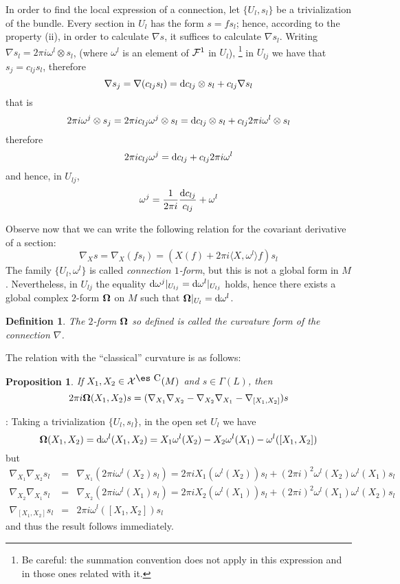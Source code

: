 \documentclass[12pt]{article}
\theoremstyle{plain}
\newtheorem{prop}{Proposition}
\newtheorem{definition}{Definition}
\def\beq{\begin{equation}}
\def\eeq{\end{equation}}
\def\beann{\begin{eqnarray*}}
\def\eeann{\end{eqnarray*}}
\def\qed{\ifvmode\removelastskip\fi
{\unskip\nobreak\hfil\penalty50\hbox{}\nobreak\hfil
\hbox{\vrule height1.2ex width1.2ex}\parfillskip=0pt
\finalhyphendemerits=0 \par\smallskip}}
\def\d{{\rm d}}
\def\curv{{\bf \Omega}}
\def\Complex{\mbox{\es C}}
\begin{document}
In order to find the local expression of a connection,
let $\{ U_l,s_l \}$ be a trivialization of the bundle.
Every section in $U_l$ has the form $s=fs_l$;
hence, according to the property (ii),
in order to calculate $\nabla s$,
it suffices to calculate $\nabla s_l$.
Writing
$\nabla s_l = 2\pi i \omega^l  \otimes s_l$,
(where $\omega^l $ is an element of
${\cal F}^1$ in $U_l$),%
\footnote{
Be careful: the summation convention does not apply in this expression
and
in those ones related with it.
}
in $U_{l j}$ we have that
$s_j = c_{l j}s_l$,
therefore
$$
\nabla s_j =
\nabla (c_{l j}s_l) =
\d c_{l j} \otimes s_l + c_{l j} \nabla s_l
$$
that is
$$
2\pi i \omega^j \otimes s_j =
2\pi i c_{l j} \omega^j \otimes s_l =
\d c_{l j} \otimes s_l + c_{l j} 2\pi i \omega^l  \otimes s_l
$$
therefore
$$
2\pi i c_{l j} \omega^j =
\d c_{l j} + c_{l j} 2\pi i \omega^l
$$
and hence, in $U_{l j}$,
$$
\omega^j =
\frac{1}{2\pi i} \frac{\d c_{l j}}{c_{l j}} + \omega^l
$$

Observe now that we can write the following relation
for the covariant derivative of a section:
\beq
\nabla_X s =
\nabla_X (fs_l) =
(X(f) + 2\pi i \langle X,\omega^l  \rangle f) s_l
\label{expcon}
\eeq
The family
$\{ U_l,\omega^l  \}$
is called
{\it connection $1$-form},
but this is not a global form in $M$.
Nevertheless, in $U_{l j}$
the equality
$\d \omega^j \vert_{U_{l j}} = \d \omega^l  \vert_{U_{l j}}$
holds,
hence there exists a global complex $2$-form
$\curv $ on $M$ such that
$\curv  \vert_{U_l} = \d \omega^l $.

\begin{definition}
The $2$-form $\curv $
so defined is called the
{\rm curvature form} of the connection $\nabla$.
\label{cur}
\end{definition}

The relation with the ``classical'' curvature
is as follows:

\begin{prop}
If $X_1, X_2 \in {\cal X}^{\Complex}(M)$
and $s \in \Gamma (L)$, then
$$
2\pi i \curv  (X_1,X_2)s =
(\nabla_{X_1}\nabla_{X_2} - \nabla_{X_2}\nabla_{X_1} -
\nabla_{[X_1,X_2]})s
$$
\label{clacur}
\end{prop}
: Taking a trivialization
$\{ U_l,s_l \}$,
in the open set $U_l$ we have
$$
\curv  (X_1,X_2) =
\d \omega^l (X_1,X_2) =
X_1 \omega^l (X_2) - X_2 \omega^l (X_1) - \omega^l  ([X_1,X_2])
$$
but
\beann
\nabla_{X_1} \nabla_{X_2}s_l
&=&
\nabla_{X_1}(2\pi i \omega^l (X_2)s_l)=
2\pi i X_1(\omega^l (X_2))s_l + (2\pi i)^2 \omega^l  (X_2) \omega^l
(X_1)s_l
\\
\nabla_{X_2} \nabla_{X_1}s_l
&=&
\nabla_{X_2}(2\pi i \omega^l (X_1)s_l)=
2\pi i X_2(\omega^l (X_1))s_l + (2\pi i)^2 \omega^l  (X_1) \omega^l
(X_2)s_l
\\
\nabla_{[X_1,X_2]}s_l
&=&
2\pi i \omega^l ([X_1,X_2])s_l
\eeann
and thus the result follows immediately.
\qed
\end{document}
